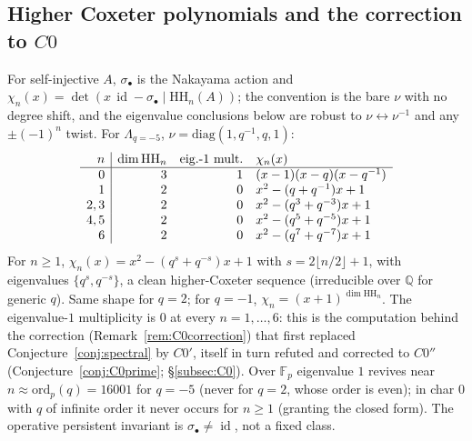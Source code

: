 \documentclass[11pt]{amsart}
\theoremstyle{definition}
\newcommand{\HH}{\mathrm{HH}}
\newcommand{\id}{\operatorname{id}}
\newcommand{\Q}{\mathbb{Q}}
\newcommand{\Fp}{\mathbb{F}_p}
\begin{document}
\subsection{Higher Coxeter polynomials and the correction to
$C0$}\label{ex:coxeter}
For self-injective $A$, $\sigma_\bullet$ is the Nakayama action and
$\chi_n(x)=\det(x\,\id-\sigma_\bullet\mid\HH_n(A))$; the convention is the bare
$\nu$ with no degree shift, and the eigenvalue conclusions below are robust to
$\nu\leftrightarrow\nu^{-1}$ and any $\pm(-1)^n$ twist. For $\Lambda_{q=-5}$,
$\nu=\mathrm{diag}(1,q^{-1},q,1)$:
\[
\begin{array}{r|r r l}
n & \dim\HH_n & \text{eig.-}1\text{ mult.} & \chi_n(x)\\
\hline
0 & 3 & 1 & (x-1)(x-q)(x-q^{-1})\\
1 & 2 & 0 & x^2-(q+q^{-1})x+1\\
2,3 & 2 & 0 & x^2-(q^3+q^{-3})x+1\\
4,5 & 2 & 0 & x^2-(q^5+q^{-5})x+1\\
6 & 2 & 0 & x^2-(q^7+q^{-7})x+1
\end{array}
\]
For $n\ge1$, $\chi_n(x)=x^2-(q^s+q^{-s})x+1$ with $s=2\lfloor n/2\rfloor+1$, with
eigenvalues $\{q^s,q^{-s}\}$, a clean higher-Coxeter sequence (irreducible over
$\Q$ for generic $q$). Same shape for $q=2$; for $q=-1$,
$\chi_n=(x+1)^{\dim\HH_n}$. The eigenvalue-$1$ multiplicity is $0$ at every
$n=1,\dots,6$: this is the computation behind the correction
(Remark~\ref{rem:C0correction}) that first replaced Conjecture~\ref{conj:spectral}
by $C0'$, itself in turn refuted and corrected to $C0''$
(Conjecture~\ref{conj:C0prime}; \S\ref{subsec:C0}). Over $\Fp$ eigenvalue $1$
revives near $n\approx\mathrm{ord}_p(q)=16001$ for $q=-5$ (never for $q=2$,
whose order is even); in char $0$ with $q$ of infinite
order it never occurs for $n\ge1$ (granting the closed form). The operative
persistent invariant is $\sigma_\bullet\ne\id$, not a fixed class.
\end{document}

